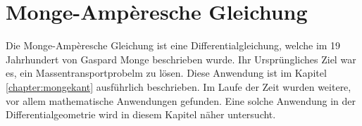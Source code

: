 %
%
%
%
\chapter{Monge-Ampèresche Gleichung\label{chapter:mongeampere}}
\begin{refsection}

Die Monge-Ampèresche Gleichung ist eine Differentialgleichung, welche
im 19 Jahrhundert von Gaspard Monge beschrieben wurde. 
Ihr Ursprüngliches Ziel war es, ein Massentransportprobelm zu lösen. 
Diese Anwendung ist im Kapitel \ref{chapter:mongekant} ausführlich beschrieben.
Im Laufe der Zeit wurden weitere, vor allem mathematische Anwendungen
gefunden.
Eine solche Anwendung in der Differentialgeometrie wird in diesem Kapitel näher 
untersucht.




% 

\printbibliography[heading=subbibliography]
\end{refsection}
